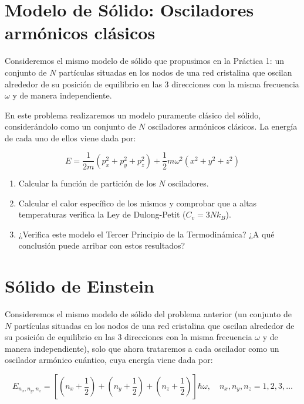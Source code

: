 \documentclass[a4paper,11pt]{article}
\begin{document}
\section{Modelo de Sólido: Osciladores armónicos clásicos}
\label{sec:oscilador-clasico}

Consideremos el mismo modelo de sólido que propusimos en la Práctica 1:
un conjunto de $N$ partículas situadas en los nodos de una red
cristalina que oscilan alrededor de su posición de equilibrio en las 3
direcciones con la misma frecuencia $\omega$ y de manera independiente.

En este problema realizaremos un modelo puramente clásico del sólido,
considerándolo como un conjunto de $N$ osciladores armónicos clásicos.
La energía de cada uno de ellos viene dada por:

$$ E = \frac{1}{2m}(p_x^2 + p_y^2 + p_z^2) +
       \frac{1}{2} m \omega^2 (x^2 + y^2 + z^2) $$


\begin{enumerate}[label=(\alph*),
                  leftmargin=2\parindent,
                  rightmargin=2\parindent]

    \item{Calcular la función de partición de los $N$ osciladores.}

    \item{Calcular el calor específico de los mismos y comprobar que a
          altas temperaturas verifica la Ley de Dulong-Petit
          ($C_v = 3Nk_B$).}

    \item{¿Verifica este modelo el Tercer Principio de la
          Termodinámica? ¿A qué conclusión puede arribar con estos
          resultados?}

\end{enumerate}



\section{Sólido de Einstein}

Consideremos el mismo modelo de sólido del problema anterior (un
conjunto de $N$ partículas situadas en los nodos de una red cristalina
que oscilan alrededor de su posición de equilibrio en las 3 direcciones
con la misma frecuencia $\omega$ y de manera independiente), solo que
ahora trataremos a cada oscilador como un oscilador armónico
cuántico, cuya energía viene dada por:

$$
E_{n_x, n_y, n_z} = \left[
                    \left( n_x + \frac{1}{2} \right) +
                    \left( n_y + \frac{1}{2} \right) +
                    \left( n_z + \frac{1}{2} \right)
                    \right]
                    \hbar \omega,
\quad
n_x, n_y, n_z = 1, 2, 3, \dots
$$
\end{document}

